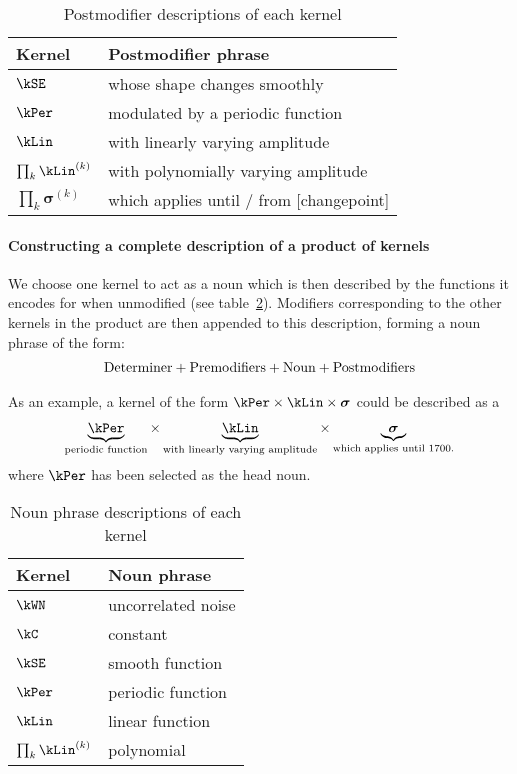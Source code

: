 \begin{table}[ht]
\centering
\begin{tabular}{l|l}
Kernel & Postmodifier phrase \\
\midrule
$\kSE$  & whose shape changes smoothly \\
$\kPer$ & modulated by a periodic function \\
$\kLin$ & with linearly varying amplitude \\
$\prod_k \kLin^{(k)}$ & with polynomially varying amplitude \\
$\prod_k \boldsymbol{\sigma}^{(k)}$ & which applies until / from [changepoint] \\
\end{tabular}
\caption[Postmodifier descriptions of each kernel.]{
Postmodifier descriptions of each kernel
}
\label{table:modifiers}
\end{table}

\paragraph{Constructing a complete description of a product of kernels}
We choose one kernel to act as a noun which is then described by the functions it encodes for when unmodified (see table~\ref{table:nouns}).
Modifiers corresponding to the other kernels in the product are then appended to this description, forming a noun phrase of the form:
\begin{align*}
\textnormal{Determiner}	+	\textnormal{Premodifiers} +	\textnormal{Noun}	+	\textnormal{Postmodifiers}
\end{align*}

As an example, a kernel of the form $\kPer \times  \kLin \times \boldsymbol{\sigma}$ could be described as a
\begin{align*}
\underbrace{\kPer}_{\textnormal{\scriptsize periodic function}} \times 
\underbrace{\kLin}_{\textnormal{\scriptsize with linearly varying amplitude}} \times 
\underbrace{\boldsymbol{\sigma}}_{\textnormal{\scriptsize which applies until 1700.}}
\end{align*}
where $\kPer$ has been selected as the head noun.

\begin{table}[ht]
\centering
\begin{tabular}{l|l}
Kernel & Noun phrase \\
\midrule
$\kWN$  & uncorrelated noise \\
$\kC$   & constant \\
$\kSE$  & smooth function \\
$\kPer$ & periodic function \\
$\kLin$ & linear function \\
$\prod_k \kLin^{(k)}$ & polynomial \\
\end{tabular}
\caption[Noun phrase descriptions of each kernel]{
Noun phrase descriptions of each kernel
}
\label{table:nouns}
\end{table}

